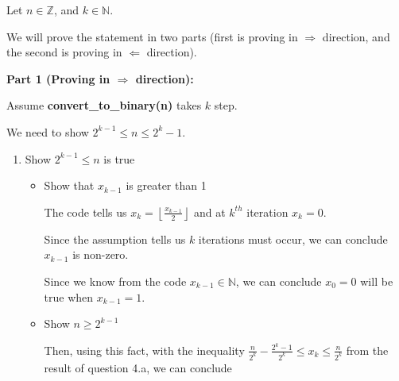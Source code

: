 \documentclass[12pt]{article}
\begin{document}
\begin{enumerate}[a.]
\begin{mdframed}
        Let $n \in \mathbb{Z}$, and $k \in \mathbb{N}$.

        \bigskip

        We will prove the statement in two parts (first is proving in $\Rightarrow$
        direction, and the second is proving in $\Leftarrow$ direction).

        \bigskip

        \textbf{Part 1 (Proving in $\Rightarrow$ direction):}

        \bigskip

        Assume \textbf{convert\_to\_binary(n)} takes $k$ step.

        \bigskip

        We need to show $2^{k-1} \leq n \leq 2^k - 1$.

        \bigskip

        \begin{enumerate}[1.]
            \item Show $2^{k-1} \leq n$ is true
            \begin{itemize}
                \item Show that $x_{k-1}$ is greater than 1

                \bigskip

                \begin{mdframed}
                    The code tells us $x_k = \left\lfloor \frac{x_{k-1}}{2} \right\rfloor$
                    and at $k^{th}$ iteration $x_k = 0$.

                    \bigskip

                    Since the assumption tells us $k$ iterations must occur, we
                    can conclude $x_{k-1}$ is non-zero.

                    \bigskip

                    Since we know from the code $x_{k-1} \in \mathbb{N}$, we can conclude
                    $x_0 = 0$ will be true when $x_{k-1} = 1$.

                \end{mdframed}

                \bigskip

                \item Show $n \geq 2^{k-1}$

                \bigskip

                \begin{mdframed}
                    Then, using this fact, with the inequality $\frac{n}{2^k} - \frac{2^k - 1}{2^k} \leq x_k \leq \frac{n}{2^k}$
                    from the result of question 4.a, we can conclude


\end{mdframed}
\end{itemize}
\end{enumerate}
\end{mdframed}
\end{enumerate}
\end{document}
